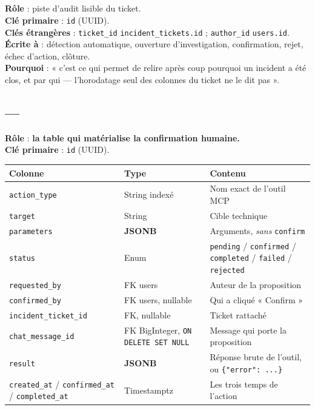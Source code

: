 \subsection{}

\textbf{Rôle} : piste d'audit lisible du ticket.\\
\textbf{Clé primaire} : \texttt{id} (UUID).\\
\textbf{Clés étrangères} : \texttt{ticket\_id} \arrowto{}
\texttt{incident\_tickets.id} ; \texttt{author\_id} \arrowto{} \texttt{users.id}.\\
\textbf{Écrite à} : détection automatique, ouverture d'investigation,
confirmation, rejet, échec d'action, clôture.\\
\textbf{Pourquoi} : « c'est ce qui permet de relire après coup pourquoi un
incident a été clos, et par qui --- l'horodatage seul des colonnes du ticket ne
le dit pas ».

\subsection{ --- }

\textbf{Rôle} : \textbf{la table qui matérialise la confirmation humaine.}\\
\textbf{Clé primaire} : \texttt{id} (UUID).

\begin{longtable}{@{}p{3.8cm}p{2.9cm}p{7.9cm}@{}}
\toprule
\textbf{Colonne} & \textbf{Type} & \textbf{Contenu}\\
\midrule
\endhead
\texttt{action\_type} & String indexé & Nom exact de l'outil MCP\\
\texttt{target} & String & Cible technique\\
\texttt{parameters} & \textbf{JSONB} & Arguments, \emph{sans} \texttt{confirm}\\
\texttt{status} & Enum & \texttt{pending} / \texttt{confirmed} / \texttt{completed} / \texttt{failed} / \texttt{rejected}\\
\texttt{requested\_by} & FK users & Auteur de la proposition\\
\texttt{confirmed\_by} & FK users, nullable & Qui a cliqué « Confirm »\\
\texttt{incident\_ticket\_id} & FK, nullable & Ticket rattaché\\
\texttt{chat\_message\_id} & FK BigInteger, \texttt{ON DELETE SET NULL} & Message qui porte la proposition\\
\texttt{result} & \textbf{JSONB} & Réponse brute de l'outil, ou \texttt{\{"error": ...\}}\\
\texttt{created\_at} / \texttt{confirmed\_at} / \texttt{completed\_at} & Timestamptz & Les trois temps de l'action\\
\bottomrule
\end{longtable}

